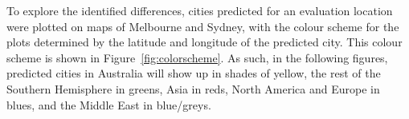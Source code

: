 \documentclass[urbansci,article,submit,moreauthors,pdftex]{Definitions/mdpi}
\begin{document}
\begin{landscape}
\begin{table}[!htbp]
\begin{subtable}{.34\linewidth}
\caption{GSV-BSV}
\label{tab:melbournesydneyGSV} 
\end{subtable}%
\end{table}
\end{landscape}


To explore the identified differences, cities predicted for an evaluation location were plotted on maps of Melbourne and Sydney, with the colour scheme for the plots determined by the latitude and longitude of the predicted city. This colour scheme is shown in Figure~\ref{fig:colorscheme}.  As such, in the following figures, predicted cities in Australia will show up in shades of yellow, the rest of the Southern Hemisphere in greens, Asia in reds, North America and Europe in blues, and the Middle East in blue/greys.
\end{document}
